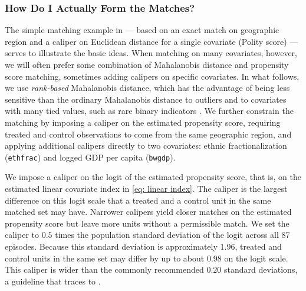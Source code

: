 \documentclass[
  12pt,
  leqno]{article}
\begin{document}
\subsubsection{How Do I Actually Form the
Matches?}\label{how-do-i-actually-form-the-matches}

The simple matching example in
--- based on an exact match on geographic region and a caliper on
Euclidean distance for a single covariate (Polity score) --- serves to
illustrate the basic ideas. When matching on many covariates, however,
we will often prefer some combination of Mahalanobis distance and
propensity score matching, sometimes adding calipers on specific
covariates. In what follows, we use \emph{rank-based} Mahalanobis
distance, which has the advantage of being less sensitive than the
ordinary Mahalanobis distance to outliers and to covariates with many
tied values, such as rare binary indicators
\citep[pp.~171--172]{rosenbaum2010}. We further constrain the matching
by imposing a caliper on the estimated propensity score, requiring
treated and control observations to come from the same geographic
region, and applying additional calipers directly to two covariates:
ethnic fractionalization (\texttt{ethfrac}) and logged GDP per capita
(\texttt{bwgdp}).

We impose a caliper on the logit of the estimated propensity score, that
is, on the estimated linear covariate index in \eqref{eq: linear index}.
The caliper is the largest difference on this logit scale that a treated
and a control unit in the same matched set may have. Narrower calipers
yield closer matches on the estimated propensity score but leave more
units without a permissible match. We set the caliper to \(0.5\) times
the population standard deviation of the logit across all 87 episodes.
Because this standard deviation is approximately 1.96, treated and
control units in the same set may differ by up to about 0.98 on the
logit scale. This caliper is wider than the commonly recommended
\(0.20\) standard deviations, a guideline that traces to \citet[Table
2.3.1, p.~421]{cochranrubin1973}.

\singlespacing
\end{document}
